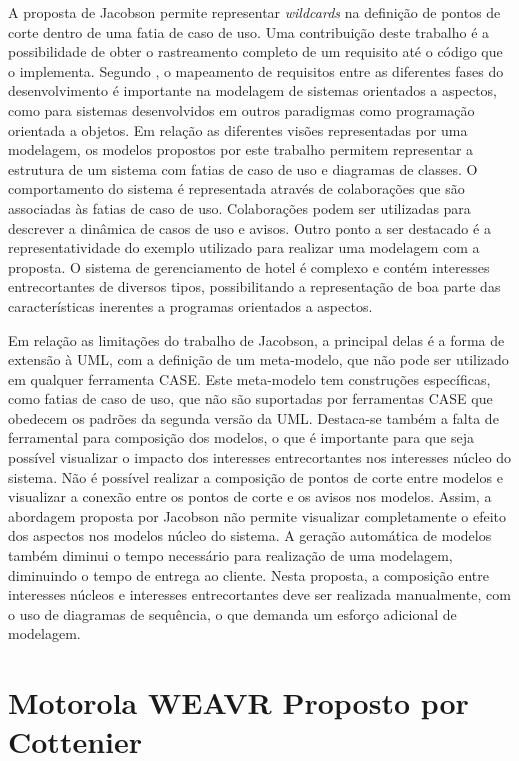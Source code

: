 A proposta de Jacobson permite representar \textit{wildcards} na definição de pontos de corte dentro de uma fatia de caso de uso. Uma contribuição deste trabalho é a possibilidade de obter o rastreamento completo de um requisito até o código que o implementa. Segundo \cite{wimmer:2011:SUA:1978802.1978807}, 
o mapeamento de requisitos entre as diferentes fases do desenvolvimento é importante na modelagem de sistemas orientados a aspectos, como para
sistemas desenvolvidos em outros paradigmas como programação orientada a objetos. Em relação as diferentes visões representadas por uma modelagem, os
modelos propostos por este trabalho permitem representar a estrutura de um sistema com fatias de caso de uso e diagramas de classes. O comportamento
do sistema é representada através de colaborações que são associadas às fatias de caso de uso. Colaborações podem ser utilizadas para descrever a
dinâmica de casos de uso e avisos. Outro ponto a ser destacado é a representatividade do exemplo utilizado para realizar uma modelagem com
a proposta. O sistema de gerenciamento de hotel é complexo e contém interesses entrecortantes de diversos tipos, possibilitando a representação de boa
parte das características inerentes a programas orientados a aspectos.

Em relação as limitações do trabalho de Jacobson, a principal delas é a forma de extensão à UML, com a definição de um meta-modelo, que não pode ser utilizado 
em qualquer ferramenta CASE. Este meta-modelo tem construções específicas, como fatias de caso de uso, que não são suportadas por ferramentas CASE que
obedecem os padrões da segunda versão da UML. Destaca-se também a falta de ferramental para composição dos modelos, o que é importante para que seja
possível visualizar o impacto dos interesses entrecortantes nos interesses núcleo do sistema. Não é possível realizar a composição de pontos de corte entre modelos e visualizar a conexão entre os pontos de corte e os avisos nos modelos. Assim, a abordagem proposta por
Jacobson não permite visualizar completamente o efeito dos aspectos nos modelos núcleo do sistema. A geração automática de modelos também diminui o
tempo necessário para realização de uma modelagem, diminuindo o tempo de entrega ao cliente. Nesta proposta, a composição entre interesses núcleos e
interesses entrecortantes deve ser realizada manualmente, com o uso de diagramas de sequência, o que demanda um esforço adicional de modelagem.

\section{Motorola WEAVR Proposto por Cottenier}

